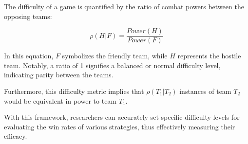 The difficulty of a game is quantified by the ratio of combat powers between the opposing teams:

\[ \rho(H | F) = \frac{Power(H)}{Power(F)} \]

In this equation, \( F \) symbolizes the friendly team, while \( H \) represents the hostile team. Notably, a ratio of 1 signifies a balanced or normal difficulty level, indicating parity between the teams.

Furthermore, this difficulty metric implies that \( \rho(T_1 | T_2) \) instances of team \( T_2 \) would be equivalent in power to team \( T_1 \).

With this framework, researchers can accurately set specific difficulty levels for evaluating the win rates of various strategies, thus effectively measuring their efficacy.

